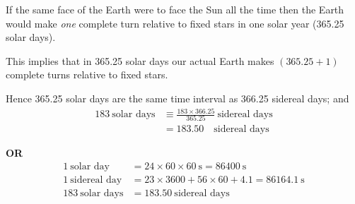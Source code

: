 If the same face of the Earth were to face the Sun all the time then the Earth
would make \emph{one} complete turn relative to fixed stars in one solar year
(365.25 solar days).

This implies that in 365.25 solar days our actual Earth makes $(365.25+1)$
complete turns relative to fixed stars.

Hence 365.25 solar days are the same time interval as 366.25 sidereal days;
and
\begin{align*}
  183\ \text{solar days} &\equiv \frac{183 \times 366.25}{365.25}\
    \text{sidereal days} \\
  &= 183.50\quad\text{sidereal days}
\end{align*}

\noindent\textbf{OR}
\begin{align*}
  1\ \text{solar day} &= 24 \times 60 \times 60\ \mathrm{s} = 86400\ \mathrm{s} \\
  1\ \text{sidereal day} &= 23 \times 3600 + 56 \times 60 + 4.1 = 86164.1\ \mathrm{s} \\
  183\ \text{solar days} &= 183.50\ \text{sidereal days}
\end{align*}
